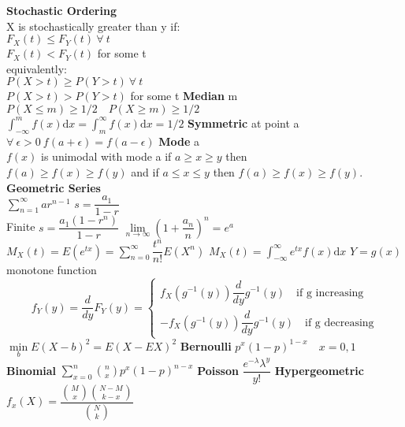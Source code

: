 \documentclass{article}
\newcommand{\dx}{\mathrm{d}x}
\begin{document}
\begin{flushleft}
\textbf{Stochastic Ordering}\\
X is stochastically greater than y if:\\
$F_X(t)\leq F_Y(t) \ \forall \ t$\\
$F_X(t)<F_Y(t) $ for some t\\
equivalently:\\
$P(X>t)\geq P(Y>t) \ \forall \ t$\\
$P(X>t)> P(Y>t)$ for some t\medbreak
\textbf{Median} m\\
$P(X\leq m)\geq 1/2 \quad P(X\geq m)\geq 1/2$\\
$\int_{-\infty}^{m}f(x)\dx=\int_{m}^{\infty}f(x)\dx=1/2$\medbreak
\textbf{Symmetric} at point a\\
$\forall \ \epsilon>0 \ f(a+\epsilon)=f(a-\epsilon)$\medbreak
\textbf{Mode} a\\
$f(x)$ is unimodal with mode a if $a\geq x \geq y$ then\\
$f(a)\geq f(x)\geq f(y)$ and if $a\leq x \leq y$ then $f(a)\geq f(x)\geq f(y)$. \medbreak 
\textbf{Geometric Series}\\
$\sum_{n=1}^{\infty}ar^{n-1}$ $s=\dfrac{a_1}{1-r}$\\
Finite $s=\dfrac{a_1(1-r^n)}{1-r}$\medbreak
$\lim \limits_{n \to \infty} \left(1+\dfrac{a_n}{n}\right)^n=e^a$\medbreak
$M_X(t)=E(e^{tx})=\sum_{n=0}^{\infty}\dfrac{t^n}{n!}E(X^n)$\medbreak
$M_X(t)=\int_{-\infty}^{\infty}e^{tx}f(x)\dx$\medbreak
$Y=g(x)$ monotone function
\[f_Y(y)=\dfrac{d}{dy}F_Y(y)=\begin{cases}
f_X(g^{-1}(y))\dfrac{d}{dy}g^{-1}(y) \quad \text{if g increasing}\\
-f_X(g^{-1}(y))\dfrac{d}{dy}g^{-1}(y) \quad \text{if g decreasing}
\end{cases}
\]
$\min \limits_{b} E(X-b)^2=E(X-EX)^2$\medbreak
\textbf{Bernoulli} $p^x(1-p)^{1-x} \quad x=0,1$ \medbreak
\textbf{Binomial} $\sum_{x=0}^{n}{n\choose x}p^x(1-p)^{n-x}$\medbreak
\textbf{Poisson} $\dfrac{e^{-\lambda}\lambda^y}{y!}$\medbreak
\textbf{Hypergeometric} $f_x(X)=\dfrac{{M\choose x}{N-M \choose k-x}}{{N\choose k}}$\medbreak


\end{flushleft}
\end{document}
